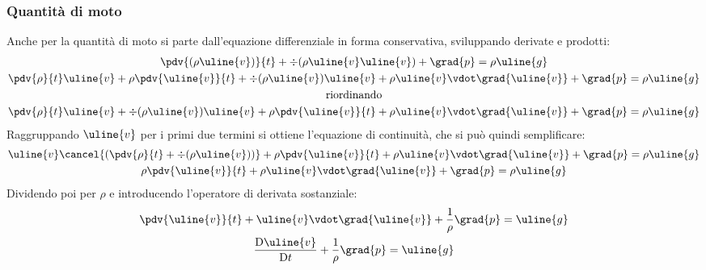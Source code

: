 \subsubsection{Quantità di moto}
Anche per la quantità di moto si parte dall'equazione differenziale in forma conservativa, sviluppando derivate e prodotti:
%
	\begin{equation*}
		\begin{gathered}
			\pdv{(\rho \uline{v})}{t} + \div{(\rho \uline{v} \uline{v})} + \grad{p} = \rho \uline{g} \\
			\pdv{\rho}{t} \uline{v} + \rho \pdv{\uline{v}}{t} + \div{(\rho \uline{v})} \uline{v} + \rho \uline{v} \vdot \grad{\uline{v}} + \grad{p} = \rho \uline{g}\\
			\text{riordinando}\\
			\pdv{\rho}{t} \uline{v} + \div{(\rho \uline{v})} \uline{v} + \rho \pdv{\uline{v}}{t} + \rho \uline{v} \vdot \grad{\uline{v}} + \grad{p} = \rho \uline{g}
		\end{gathered}
	\end{equation*}
%
Raggruppando $\uline{v}$ per i primi due termini si ottiene l'equazione di continuità, che si può quindi semplificare:
%
	\begin{equation*}
		\begin{gathered}
			\uline{v} \cancel{\left( \pdv{\rho}{t} + \div{(\rho \uline{v})} \right)} + \rho \pdv{\uline{v}}{t} + \rho \uline{v} \vdot \grad{\uline{v}} + \grad{p} = \rho \uline{g}\\
			\rho \pdv{\uline{v}}{t} + \rho \uline{v} \vdot \grad{\uline{v}} + \grad{p} = \rho \uline{g}
		\end{gathered}
	\end{equation*}
%
Dividendo poi per $\rho$ e introducendo l'operatore di derivata sostanziale:
%
	\begin{equation*}
		\begin{gathered}
			\pdv{\uline{v}}{t} + \uline{v} \vdot \grad{\uline{v}} + \frac{1}{\rho} \grad{p} = \uline{g}\\
			\frac{\mathrm{D} \uline{v}}{\mathrm{D} t} + \frac{1}{\rho} \grad{p} = \uline{g}
		\end{gathered}
	\end{equation*}
%

